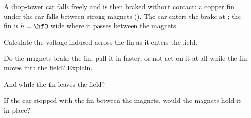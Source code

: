 A drop-tower car falls freely and is then braked without contact: a copper fin under the car falls between strong magnets (\BmO). The car enters the brake at \vO; the fin is $h = \hfO$ wide where it passes between the magnets.

\begin{abcliste}
\abc Calculate the voltage induced across the fin as it enters the field.

\abc Do the magnets brake the fin, pull it in faster, or not act on it at all while the fin moves into the field? Explain.

\abc And while the fin leaves the field?

\abc If the car stopped with the fin between the magnets, would the magnets hold it in place?
\end{abcliste}
